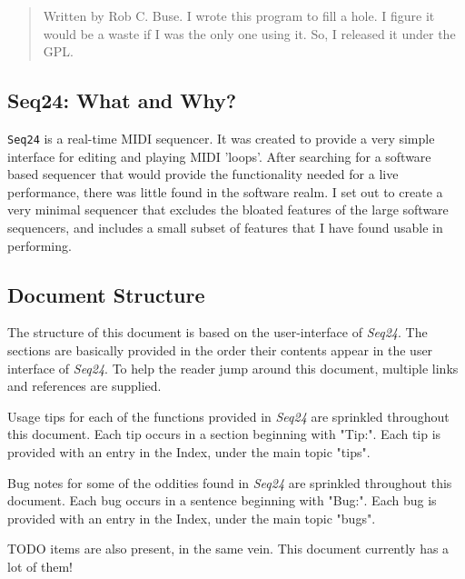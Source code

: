 \documentclass[
 11pt,
 twoside,
 a4paper,
 headinclude,
 footinclude,
 final                                 %
]{article}
\begin{document}
   \begin{quotation}
      Written by Rob C. Buse.  I wrote this program to fill a
      hole.  I figure it would be a waste if I was the only one
      using it.  So, I released it under the GPL.
   \end{quotation}

\subsection{Seq24: What and Why?}
\label{subsec:introduction_seq24_vs_others}

   \texttt{Seq24} is a real-time MIDI sequencer. It was created to 
   provide a very simple interface for editing and playing 
   MIDI 'loops'. After searching for a software based 
   sequencer that would provide the functionality needed for 
   a live performance, there was little found in the 
   software realm. I set out to create a very minimal sequencer 
   that excludes the bloated features of the large software 
   sequencers, and includes a small subset of features that 
   I have found usable in performing. 

\subsection{Document Structure}
\label{subsec:introduction_document_structure}

   The structure of this document is based on the user-interface of
   \textsl{Seq24}.
   The sections are basically provided
   in the order their contents appear in the user interface of
   \textsl{Seq24}.  To help the reader jump around this document, multiple
   links and references are supplied.

   Usage tips
   for each of the functions provided in
   \textsl{Seq24} are sprinkled throughout this document.
   Each tip occurs in a section beginning with "Tip:".
   Each tip is provided with an entry in the Index, under the
   main topic "tips".

   Bug notes
   for some of the oddities found in \textsl{Seq24} are
   sprinkled throughout this document.
   Each bug occurs in a sentence beginning with "Bug:".
   Each bug is provided with an entry in the Index, under the
   main topic "bugs".

   TODO items
   are also present, in the same vein.
   This document currently has a lot of them!
\end{document}
